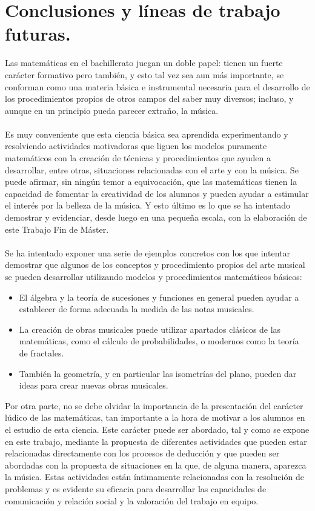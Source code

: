 \documentclass[a4paper, openright, 11pt, titlepage]{report}
\theoremstyle{definition}\newtheorem{defin}[propo]{Definition}
\theoremstyle{definition}\newtheorem{obser}[propo]{Remark}
\theoremstyle{definition}\newtheorem{ejem}[propo]{Ejemplo}
\theoremstyle{definition}\newtheorem{algoritmo}[propo]{Algoritmo}
\begin{document}
\chapter{Conclusiones y líneas de trabajo futuras.}
Las matemáticas en el bachillerato juegan un doble papel: tienen un fuerte carácter formativo pero también, y esto tal vez sea aun más importante, se conforman como una materia básica e instrumental necesaria para el desarrollo de los procedimientos propios de otros campos del saber muy diversos; incluso, y aunque en un principio pueda parecer extraño, la música.\\\\
Es muy conveniente que esta ciencia básica sea aprendida experimentando y resolviendo actividades motivadoras que liguen los modelos puramente matemáticos con la creación de técnicas y procedimientos que ayuden a desarrollar, entre otras, situaciones relacionadas con el arte y con la música. Se puede afirmar, sin ningún temor a equivocación, que las matemáticas tienen la capacidad de fomentar la creatividad de los alumnos y pueden ayudar a estimular el interés por la belleza de la música. Y esto último es lo que se ha intentado demostrar y evidenciar, desde luego en una pequeña escala, con la elaboración de este Trabajo Fin de Máster.\\\\
Se ha intentado exponer una serie de ejemplos concretos con los que intentar demostrar que algunos de los conceptos y procedimiento propios del arte musical se pueden desarrollar utilizando modelos y procedimientos matemáticos básicos:
\begin{itemize}
    \item El álgebra y la teoría de sucesiones y funciones en general pueden ayudar a establecer de forma adecuada la medida de las notas musicales.
    \item La creación de obras musicales puede utilizar apartados clásicos de las matemáticas, como el cálculo de probabilidades, o modernos como la teoría de fractales.
    \item También la geometría, y en particular las isometrías del plano, pueden dar ideas para crear nuevas obras musicales.
\end{itemize}
Por otra parte, no se debe olvidar la importancia de la presentación del carácter lúdico de las matemáticas, tan importante a la hora de motivar a los alumnos en el estudio de esta ciencia. Este carácter puede ser abordado, tal y como se expone en este trabajo, mediante la propuesta de diferentes actividades que pueden estar relacionadas directamente con los procesos de deducción y que pueden ser abordadas con la propuesta de situaciones en la que, de alguna manera, aparezca la música. Estas actividades están íntimamente relacionadas con la resolución de problemas y es evidente su eficacia para desarrollar las capacidades de comunicación y relación social y la valoración del trabajo en equipo.\\\\
\end{document}
